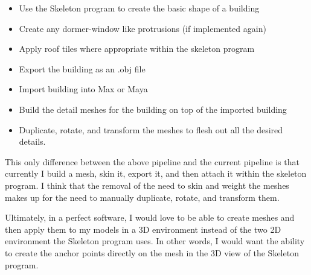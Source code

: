 \begin{itemize}
\item{Use the Skeleton program to create the basic shape of a building}
\item{Create any dormer-window like protrusions (if implemented again)}
\item{Apply roof tiles where appropriate within the skeleton program}
\item{Export the building as an .obj file}
\item{Import building into Max or Maya}
\item{Build the detail meshes for the building on top of the imported building}
\item{Duplicate, rotate, and transform the meshes to flesh out all the desired details.}
\end{itemize}

This only difference between the above pipeline and the current pipeline is that currently I build a mesh, skin it, export it, and then attach it within the skeleton program. I think that the removal of the need to skin and weight the meshes makes up for the need to manually duplicate, rotate, and transform them.

Ultimately, in a perfect software, I would love to be able to create meshes and then apply them to my models in a 3D environment instead of the two 2D environment the Skeleton program uses. In other words, I would want the ability to create the anchor points directly on the mesh in the 3D view of the Skeleton program. 


